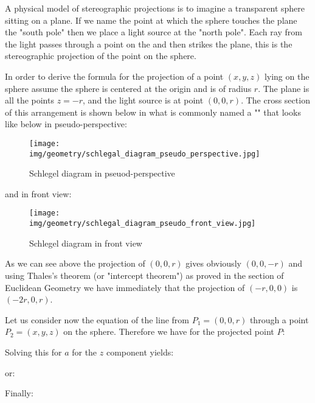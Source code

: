 	A physical model of stereographic projections is to imagine a transparent sphere sitting on a plane. If we name the point at which  the sphere touches the plane the "south pole" then we place a light source at the "north pole". Each ray from the light passes through a point on the and then strikes the plane, this is the stereographic projection of the point on the sphere. 
	
	In order to derive the formula for the projection of a point $(x,y,z)$ lying on the sphere assume the sphere is centered at the origin and is of radius $r$. The plane is all the points $z = -r$, and the light source is at point $(0,0,r)$. The cross section of this arrangement is shown below in what is commonly named a "" that looks like below in pseudo-perspective:
	\begin{figure}[H]
		\centering
		\texttt{[image: img/geometry/schlegal\_diagram\_pseudo\_perspective.jpg]}
		\caption{Schlegel diagram in pseuod-perspective}
	\end{figure}
	and in front view:
	\begin{figure}[H]
		\centering
		\texttt{[image: img/geometry/schlegal\_diagram\_pseudo\_front\_view.jpg]}
		\caption[]{Schlegel diagram in front view}
	\end{figure}
	As we can see above the projection of $(0,0,r)$ gives obviously $(0,0,-r)$ and using Thales's theorem (or "intercept theorem") as proved in the section of Euclidean Geometry we have immediately that the projection of $(-r,0,0)$ is $(-2r,0,r)$.
	
	Let us consider now the equation of the line from $P_1=(0,0,r)$ through a point $P_2=(x,y,z)$ on the sphere. Therefore we have for the projected point $P$:
	
	Solving this for $a$ for the $z$ component yields:
	
	or:
	
	Finally:
	
